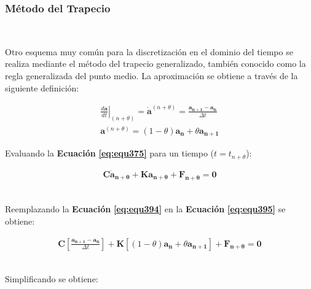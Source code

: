 \subsubsection{Método del Trapecio}~\hypertarget{sec:sec3423}{}
\label{sec:sec3423}

Otro esquema muy común para la discretización en el dominio del tiempo se realiza mediante el método del trapecio generalizado, también conocido como la regla generalizada del punto medio. La aproximación se obtiene a través de la siguiente definición:

\begin{ceqn} 
\begin{subequations} \label{eq:equ394} 
\begin{gather}
\left.\frac{d\mathbf{a}}{dt}\right|_{(n+\theta)} =  \mathbf{\dot{a}}^{(n+\theta)} = \frac{\mathbf{a_{n+1}} - \mathbf{a_{n}}}{\Delta t} \label{eq:equ394a}\\[12pt]
\mathbf{a}^{(n+\theta)} = (1-\theta)\mathbf{a_n} + \theta\mathbf{a_{n+1}}\label{eq:equ394b}
\end{gather}  
\end{subequations} 
\end{ceqn}

Evaluando la \textbf{Ecuación} \textbf{\ref{eq:equ375}} para un tiempo ($t=t_{n+\theta}$):

\begin{ceqn} %
\begin{gather}\label{eq:equ395}
 \mathbf{C}\mathbf{\dot{a}_{n+\theta}} + \mathbf{K}\mathbf{a_{n+\theta}} + \mathbf{F_{n+\theta}} = \mathbf{0}
\end{gather}   
\end{ceqn}
\\
Reemplazando la \textbf{Ecuación} \textbf{\ref{eq:equ394}} en la \textbf{Ecuación} \textbf{\ref{eq:equ395}} se obtiene:

\begin{ceqn} %
\begin{gather}\label{eq:equ396}
 \mathbf{C}\left[\frac{\mathbf{a_{n+1}} - \mathbf{a_{n}}}{\Delta t} \right] + \mathbf{K}\left[(1-\theta)\mathbf{a_n} + \theta\mathbf{a_{n+1}} \right] + \mathbf{F_{n+\theta}} = \mathbf{0}
\end{gather}   
\end{ceqn}
\\
Simplificando se obtiene:

